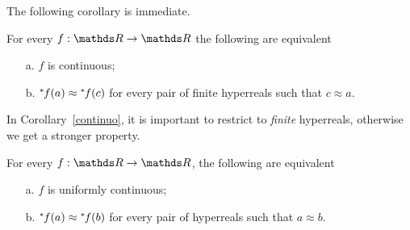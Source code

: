 The following corollary is immediate.

\begin{corollary} \label{continuo} For every $f:\RR\to\RR$ the following are equivalent
\begin{itemize}
\item[a.] $f$ is continuous;
\item[b.] ${}^*\kern-.2ex f(a)\approx {}^*\kern-.2ex f(c)$ for every pair of finite hyperreals such that $c\approx a$.
\end{itemize}
\end{corollary}

In Corollary~\ref{continuo}, it is important to restrict  to \textit{finite\/} hyperreals, otherwise we get a stronger property.

\begin{proposition}\label{prop_unif_cont}
   For every $f:\RR\to\RR$, the following are equivalent
\begin{itemize}
\item[a.] $f$ is uniformly continuous;
\item[b.] ${}^*\kern-.2ex f(a)\approx{}^*\kern-.2ex  f(b)$ for every pair of hyperreals such that $a\approx b$.
\end{itemize}
\end{proposition}


